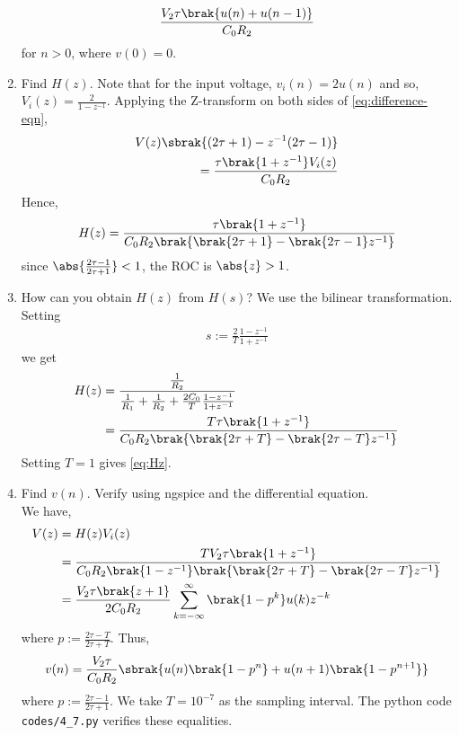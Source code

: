 \documentclass[journal,12pt,twocolumn]{IEEEtran}
\renewcommand\thesection{\arabic{section}}
\begin{document}
\begin{enumerate}[label=\arabic*.,ref=\thesection.\theenumi]
\begin{align}
    \frac{V_2\tau\brak{u(n)+u(n-1)}}{C_0R_2}
    \label{eq:difference-eqn}
\end{align}
for $n > 0$, where $v(0) = 0$.
\item Find $H(z)$.
\solution Note that for the input voltage, $v_i(n) = 2u(n)$ and
so, $V_i(z) = \frac{2}{1-z^{-1}}$. Applying the Z-transform
on both sides of \eqref{eq:difference-eqn},
\begin{align}
    V(z)\sbrak{(2\tau + 1) - z^{-1}(2\tau - 1)} \nonumber \\
    = \frac{\tau\brak{1 + z^{-1}}V_i(z)}{C_0R_2}
\end{align}
Hence,
\begin{align}
    H(z) = \frac{\tau\brak{1+z^{-1}}}{C_0R_2\brak{\brak{2\tau+1}-\brak{2\tau-1}z^{-1}}}
    \label{eq:Hz}
\end{align}
since $\abs{\frac{2\tau-1}{2\tau+1}} < 1$, the ROC is $\abs{z} > 1$.
\item How can you obtain $H(z)$ from $H(s)$?
\solution We use the bilinear transformation. Setting
\begin{align}
    s := \frac{2}{T}\frac{1 - z^{-1}}{1 + z^{-1}}
\end{align}
we get
\begin{align}
    H(z) &= \frac{\frac{1}{R_2}}{\frac{1}{R_1} + \frac{1}{R_2} + \frac{2C_0}{T}\frac{1 - z^{-1}}{1 + z^{-1}}} \\
         &= \frac{T\tau\brak{1+z^{-1}}}{C_0R_2\brak{\brak{2\tau+T}-\brak{2\tau-T}z^{-1}}}
\end{align}
Setting $T = 1$ gives \eqref{eq:Hz}.
\item Find $v(n)$. Verify using ngspice and the differential equation.
\\
\solution We have,
\begin{align}
    V(z) &= H(z)V_i(z) \\
         &= \frac{TV_2\tau\brak{1+z^{-1}}}{C_0R_2\brak{1-z^{-1}}\brak{\brak{2\tau+T}-\brak{2\tau-T}z^{-1}}} \\
         &= \frac{V_2\tau\brak{z+1}}{2C_0R_2}\sum_{k=-\infty}^{\infty}\brak{1-p^k}u(k)z^{-k}
\end{align}
where $p := \frac{2\tau-T}{2\tau+T}$. Thus,
\begin{align}
    v(n) = \frac{V_2\tau}{C_0R_2}\sbrak{u(n)\brak{1-p^n}+u(n+1)\brak{1-p^{n+1}}}
\end{align}
where $p := \frac{2\tau-1}{2\tau+1}$. We take $T = 10^{-7}$ as the
sampling interval. The python code \texttt{codes/4\_7.py} verifies
these equalities.
\begin{figure}

\end{figure}
\end{enumerate}
\end{document}
